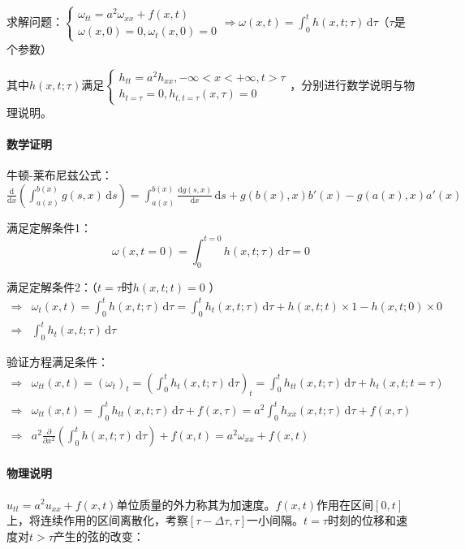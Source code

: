 求解问题：\(\begin{cases}\omega_{tt}=a^2\omega_{xx}+f(x,t)\\\omega(x,0)=0,\omega_t(x,0)=0\end{cases}\Rightarrow\omega(x,t)=\int_{0}^{t}h(x,t;\tau)\,\mathrm{d}\tau\)（\(\tau\)是个参数）

其中\(h(x,t;\tau)\)满足\(\begin{cases}h_{tt}=a^2h_{xx},-\infty<x<+\infty,t>\tau\\h_{t=\tau}=0,h_{t,t=\tau}(x,\tau)=0\end{cases}\)，分别进行数学说明与物理说明。

\paragraph{数学证明}牛顿-莱布尼兹公式：\(\frac{\mathrm{d}}{\mathrm{d}x}\left(\int_{a(x)}^{b(x)}g\left(s,x\right)\,\mathrm{d}s\right)=\int_{a(x)}^{b(x)}{\frac{\mathrm{d}g(s,x)}{\mathrm{d}x}\,\mathrm{d}s}+g(b(x),x)b'(x)-g(a(x),x)a'(x)\)

满足定解条件1：
\[
\omega(x,t=0)=\int_{0}^{t=0}h(x,t;\tau)\,\mathrm{d}\tau=0
\]

满足定解条件2：（\(t=\tau\)时\(h(x,t;t)=0\) ）
\begin{align*}
\Rightarrow&\omega_t(x,t)=\int_{0}^{t}h(x,t;\tau)\,\mathrm{d}\tau=\int_{0}^{t}{h_t(x,t;\tau)\,\mathrm{d}\tau}+h(x,t;t)\times1-h(x,t;0)\times0\\
\Rightarrow&\int_{0}^{t}{h_t(x,t;\tau)\,\mathrm{d}\tau}
\end{align*}


验证方程满足条件：
\begin{align*}
\Rightarrow&\omega_{tt}(x,t)=(\omega_t)_t=\left(\int_{0}^{t}{h_t(x,t;\tau)\,\mathrm{d}\tau}\right)_t=\int_{0}^{t}{h_{tt}(x,t;\tau)\,\mathrm{d}\tau}+h_t(x,t;t=\tau)\\
\Rightarrow&\omega_{tt}(x,t)=\int_{0}^{t}{h_{tt}(x,t;\tau)\,\mathrm{d}\tau}+f(x,\tau)=a^2\int_{0}^{t}{h_{xx}(x,t;\tau)\,\mathrm{d}\tau}+f(x,\tau)\\
\Rightarrow&a^2\frac{\partial}{\partial x^2}\left(\int_{0}^{t}h(x,t;\tau)\,\mathrm{d}\tau\right)+f(x,t)=a^2\omega_{xx}+f(x,t)
\end{align*}

\paragraph{物理说明}\(u_{tt}=a^2u_{xx}+f(x,t)\)单位质量的外力称其为加速度。\(f(x,t)\)作用在区间\([0,t]\)上，将连续作用的区间离散化，考察\([\tau-\Delta\tau,\tau]\)一小间隔。\(t=\tau\)时刻的位移和速度对\(t>\tau\)产生的弦的改变：

